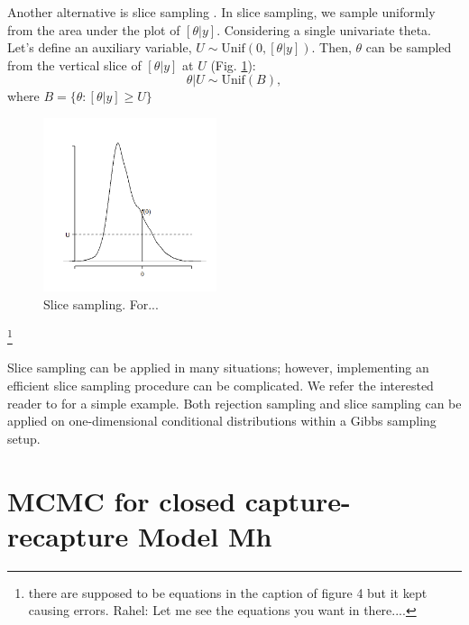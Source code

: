 Another alternative is slice sampling
\citep{neal:2003}. In slice sampling, we sample uniformly from the
area under the plot of $[\theta|y]$. Considering a single univariate
theta. Let's define an auxiliary variable, $U \sim \mbox{Unif}(0,
[\theta|y])$. Then, $\theta$ can be sampled from the vertical slice
of $[\theta|y]$ at $U$ (Fig. \ref{mcmc.fig.slicesample}):
\[
\theta|U \sim \mbox{Unif}(B),
\]
where $B = \{\theta: [\theta|y] \geq U\}$

\begin{figure}
\begin{center}
\includegraphics[height=2in]{Ch7/figs/slicesampling}
\end{center}
\caption{Slice sampling. For...}
\label{mcmc.fig.slicesample}
\end{figure}

\footnote{there are supposed to be equations in the caption of figure
4 but it kept causing errors. Rahel: Let me see the equations you want
in there....}


Slice sampling can be applied in many situations; however,
implementing an efficient slice sampling procedure can be
complicated. We refer the interested reader to 
\citet[][Chapt. 7]{robert_casella:2010} for a simple example.  Both rejection
sampling and slice sampling can be applied on one-dimensional
conditional distributions within a Gibbs sampling setup.

\section{MCMC for closed capture-recapture Model Mh}

